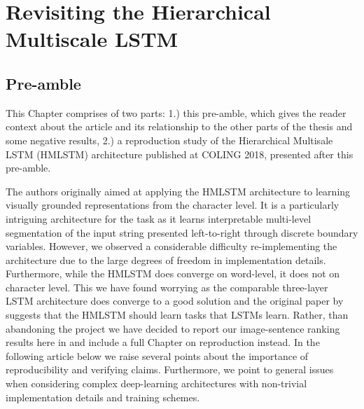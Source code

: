 
\chapter{Revisiting the Hierarchical Multiscale LSTM}

%

\section{Pre-amble}
This Chapter comprises of two parts: 1.) this pre-amble, which gives the reader context about the article and its relationship to the other parts of the thesis and some 
negative results, 
2.) a reproduction study of the Hierarchical Multisale LSTM (HMLSTM) architecture published at COLING 2018, presented after this pre-amble.

The authors originally
aimed at applying the HMLSTM architecture to learning visually grounded representations from the character level. It is a particularly
intriguing architecture for the task as it learns interpretable multi-level segmentation of the input string presented 
left-to-right through discrete boundary variables. However, we observed a considerable difficulty re-implementing the 
architecture due to the large degrees of freedom in implementation details. 
Furthermore, while the HMLSTM does converge on word-level, it does not on character level.
This we have found worrying as the comparable three-layer LSTM architecture does converge to a good solution 
and the original paper by \citep{chung2016hierarchical}
suggests that the HMLSTM should learn tasks that LSTMs learn. Rather, than abandoning 
the project we have decided to report our image-sentence ranking results here in and include a full Chapter on reproduction instead.
In the following article below we raise several points about the importance of reproducibility and verifying claims. 
Furthermore, we point to general issues when
considering complex deep-learning architectures with non-trivial implementation details and training schemes.

